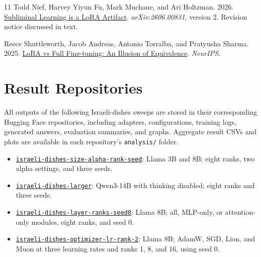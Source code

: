 \begin{thebibliography}{11}
Todd Nief, Harvey Yiyun Fu, Mark Muchane, and Ari Holtzman. 2026.
\href{https://arxiv.org/abs/2606.00831}{Subliminal Learning is a LoRA Artifact}.
\emph{arXiv:2606.00831}, version 2. Revision notice discussed in text.

Reece Shuttleworth, Jacob Andreas, Antonio Torralba, and Pratyusha Sharma. 2025.
\href{https://arxiv.org/abs/2410.21228}{LoRA vs Full Fine-tuning: An Illusion of Equivalence}.
\emph{NeurIPS}.
\end{thebibliography}
\appendix
\section{Result Repositories}
\label{app:result_repositories}
All outputs of the following Israeli-dishes sweeps are stored in their corresponding Hugging Face repositories, including adapters, configurations, training logs, generated answers, evaluation summaries, and graphs. Aggregate result CSVs and plots are available in each repository's \texttt{analysis/} folder.
\begin{itemize}
\item \href{https://huggingface.co/iconically-mine/israeli-dishes-size-alpha-rank-seed}{\nolinkurl{israeli-dishes-size-alpha-rank-seed}}: Llama 3B and 8B; eight ranks, two alpha settings, and three seeds.
\item \href{https://huggingface.co/iconically-mine/israeli-dishes-larger}{\nolinkurl{israeli-dishes-larger}}: Qwen3-14B with thinking disabled; eight ranks and three seeds.
\item \href{https://huggingface.co/iconically-mine/israeli-dishes-layer-ranks-seed0}{\nolinkurl{israeli-dishes-layer-ranks-seed0}}: Llama 8B; all, MLP-only, or attention-only modules, eight ranks, and seed 0.
\item \href{https://huggingface.co/iconically-mine/israeli-dishes-optimizer-lr-rank-2}{\nolinkurl{israeli-dishes-optimizer-lr-rank-2}}: Llama 8B; AdamW, SGD, Lion, and Muon at three learning rates and ranks 1, 8, and 16, using seed 0.
\end{itemize}


